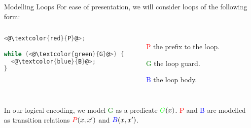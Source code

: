 \documentclass[xcolor=pdftex,t,11pt]{beamer}
\begin{document}
\begin{frame}[fragile]{Modelling Loops}
 For ease of presentation, we will consider loops of the following form:

 \begin{center}
 \begin{columns}[c]
  \begin{minipage}{\linewidth}
 \begin{lstlisting}[language=C,basicstyle=\normalsize]
<@\textcolor{red}{P}@>;

while (<@\textcolor{green}{G}@>) {
  <@\textcolor{blue}{B}@>;
}
 \end{lstlisting}
 \end{minipage}
 

 \begin{minipage}{\linewidth}
 \begin{itemize}
  \item[\textcolor{red}{P}] the prefix to the loop.
  \item[\textcolor{green}{G}] the loop guard.
  \item[\textcolor{blue}{B}] the loop body.
 \end{itemize}
 \end{minipage}
 \end{columns}

 \end{center}

\vspace{1em}
 
In our logical encoding, we model \textcolor{green}{G} as a predicate $\textcolor{green}{G}(x)$. \textcolor{red}{P} and \textcolor{blue}{B} are modelled as transition
relations $\textcolor{red}{P}(x, x')$ and $\textcolor{blue}{B}(x, x')$.
 
\end{frame}
\end{document}
